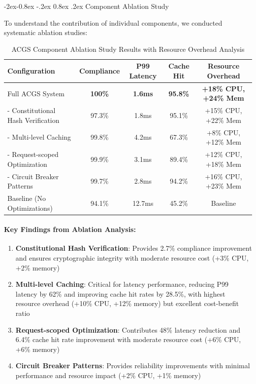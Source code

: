 \documentclass[manuscript,screen,9pt]{acmart}
\makeatletter
\renewcommand\subsubsection{\@startsection{subsubsection}{3}{\z@}%
  {-2ex\@plus -0.8ex \@minus -.2ex}%
  {0.8ex \@plus .2ex}%
  {\normalfont\normalsize\bfseries}}
\newcommand{\tablesize}{\footnotesize}
\newcommand{\tableheader}[1]{\textbf{#1}}
\makeatother
\begin{document}
\subsubsection{Component Ablation Study}
\label{subsubsec:ablation_study}

To understand the contribution of individual components, we conducted systematic ablation studies:

\begin{table}[!htb]
\centering
\caption{ACGS Component Ablation Study Results with Resource Overhead Analysis}
\label{tab:ablation_study}
\tablesize
\begin{tabular}{@{}lcccc@{}}
\toprule
\tableheader{Configuration} & \tableheader{Compliance} & \tableheader{P99 Latency} & \tableheader{Cache Hit} & \tableheader{Resource Overhead} \\
\midrule
Full ACGS System & \textbf{100\%} & \textbf{1.6ms} & \textbf{95.8\%} & \textbf{+18\% CPU, +24\% Mem} \\
- Constitutional Hash Verification & 97.3\% & 1.8ms & 95.1\% & +15\% CPU, +22\% Mem \\
- Multi-level Caching & 99.8\% & 4.2ms & 67.3\% & +8\% CPU, +12\% Mem \\
- Request-scoped Optimization & 99.9\% & 3.1ms & 89.4\% & +12\% CPU, +18\% Mem \\
- Circuit Breaker Patterns & 99.7\% & 2.8ms & 94.2\% & +16\% CPU, +23\% Mem \\
Baseline (No Optimizations) & 94.1\% & 12.7ms & 45.2\% & Baseline \\
\bottomrule
\end{tabular}
\end{table}

\paragraph{Key Findings from Ablation Analysis:}
\begin{enumerate}[leftmargin=*,itemsep=1pt,parsep=1pt]
    \item \textbf{Constitutional Hash Verification}: Provides 2.7\% compliance improvement and ensures cryptographic integrity with moderate resource cost (+3\% CPU, +2\% memory)
    \item \textbf{Multi-level Caching}: Critical for latency performance, reducing P99 latency by 62\% and improving cache hit rates by 28.5\%, with highest resource overhead (+10\% CPU, +12\% memory) but excellent cost-benefit ratio
    \item \textbf{Request-scoped Optimization}: Contributes 48\% latency reduction and 6.4\% cache hit rate improvement with moderate resource cost (+6\% CPU, +6\% memory)
    \item \textbf{Circuit Breaker Patterns}: Provides reliability improvements with minimal performance and resource impact (+2\% CPU, +1\% memory)
\end{enumerate}
\end{document}
